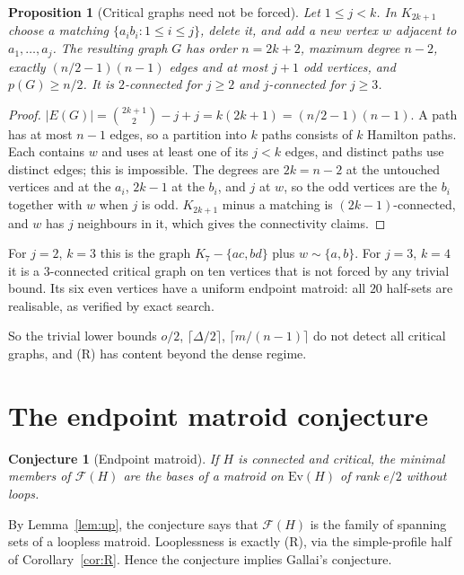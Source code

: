 \documentclass[11pt]{amsart}
\newtheorem{proposition}[theorem]{Proposition}
\newtheorem{conjecture}[theorem]{Conjecture}
\theoremstyle{definition}
\newcommand{\cF}{\mathcal F}
\newcommand{\Ev}{\mathrm{Ev}}
\begin{document}
\begin{proposition}[Critical graphs need not be forced]\label{prop:notforced}
Let $1\le j<k$. In $K_{2k+1}$ choose a matching $\{a_ib_i:1\le i\le j\}$, delete it, and add a new vertex
$w$ adjacent to $a_1,\dots,a_j$. The resulting graph $G$ has order $n=2k+2$, maximum degree $n-2$,
exactly $(n/2-1)(n-1)$ edges and at most $j+1$ odd vertices, and $p(G)\ge n/2$. It is $2$-connected for
$j\ge 2$ and $j$-connected for $j\ge3$.
\end{proposition}

\begin{proof}
$|E(G)|=\binom{2k+1}{2}-j+j=k(2k+1)=(n/2-1)(n-1)$. A path has at most $n-1$ edges, so a partition
into $k$ paths consists of $k$ Hamilton paths. Each contains $w$ and uses at least one of its $j<k$
edges, and distinct paths use distinct edges; this is impossible. The degrees are $2k=n-2$ at the
untouched vertices and at the $a_i$, $2k-1$ at the $b_i$, and $j$ at $w$, so the odd vertices are the
$b_i$ together with $w$ when $j$ is odd. $K_{2k+1}$ minus a matching is $(2k-1)$-connected, and $w$ has $j$
neighbours in it, which gives the connectivity claims.
\end{proof}

For $j=2$, $k=3$ this is the graph $K_7-\{ac,bd\}$ plus $w\sim\{a,b\}$. For $j=3$, $k=4$ it is a
$3$-connected critical graph on ten vertices that is not forced by any trivial bound. Its six even
vertices have a uniform endpoint matroid: all $20$ half-sets are realisable, as verified by exact
search.

So the trivial lower bounds $o/2$, $\lceil\Delta/2\rceil$, $\lceil m/(n-1)\rceil$ do not detect all
critical graphs, and (R) has content beyond the dense regime.

\section{The endpoint matroid conjecture}

\begin{conjecture}[Endpoint matroid]\label{conj:emc}
If $H$ is connected and critical, the minimal members of $\cF(H)$ are the bases of a matroid on
$\Ev(H)$ of rank $e/2$ without loops.
\end{conjecture}

By Lemma~\ref{lem:up}, the conjecture says that $\cF(H)$ is the family of spanning sets of a loopless
matroid. Looplessness is exactly (R), via the simple-profile half of Corollary~\ref{cor:R}. Hence the
conjecture implies Gallai's conjecture.
\end{document}

